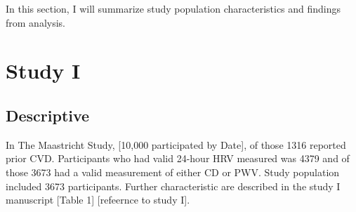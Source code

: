 \documentclass[
  a4paper,
  headsepline=true,
  open=any]{scrbook}
\begin{document}
In this section, I will summarize study population characteristics and
findings from analysis.

\hypertarget{study-i-1}{%
\section{Study I}\label{study-i-1}}

\hypertarget{descriptive}{%
\subsection{Descriptive}\label{descriptive}}

In The Maastricht Study, {[}10,000 participated by Date{]}, of those
1316 reported prior CVD. Participants who had valid 24-hour HRV measured
was 4379 and of those 3673 had a valid measurement of either CD or PWV.
Study population included 3673 participants. Further characteristic are
described in the study I manuscript {[}Table 1{]} {[}refeernce to study
I{]}.
\end{document}
